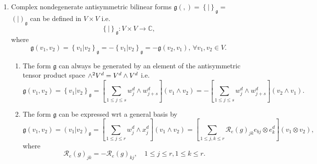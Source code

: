 \documentclass[aps,preprint]{revtex4}%
\begin{document}
\begin{enumerate}
\begin{enumerate}
\item
\begin{equation}
\left[  s\right]  \in\mathcal{B}_{00}\left(  V\right)  \cong V\otimes
V^{d}\cong V^{d}\otimes V^{d}.
\end{equation}

\end{enumerate}

\item Complex nondegenerate antisymmetric bilinear forms $\mathfrak{g}\left(
,\right)  =\left\{  \left.  {}\right\vert \left.  {}\right.  \right\}
_{\mathfrak{g}}=$ $\left(  \left.  {}\right\vert \left.  {}\right.  \right)
_{\mathfrak{g}}$ can be defined in $V\times V$ i.e.
\begin{equation}
\left\{  \left.  {}\right\vert \left.  {}\right.  \right\}  _{\mathfrak{g}%
}:V\times V\rightarrow\mathbb{C},
\end{equation}
where
\begin{equation}
\mathfrak{g}\left(  v_{1},v_{2}\right)  =\left\{  \left.  v_{1}\right\vert
v_{2}\right\}  _{\mathfrak{g}}=-\left\{  \left.  v_{1}\right\vert
v_{2}\right\}  _{\mathfrak{g}}=-\mathfrak{g}\left(  v_{2},v_{1}\right)
,\,\forall v_{1},v_{2}\in V.
\end{equation}


\begin{enumerate}
\item The form $\mathfrak{g}$ can always be generated by an element of the
antisymmetric tensor product space ${\Large \wedge}^{2}V^{d}=V^{d}\wedge
V^{d}$ i.e.
\begin{equation}
\mathfrak{g}\left(  v_{1},v_{2}\right)  =\left\{  \left.  v_{1}\right\vert
v_{2}\right\}  _{\mathfrak{g}}=\left[  \sum_{1\leq j\leq s}w_{j}^{d}\wedge
w_{j+s}^{d}\right]  \left(  v_{1}\wedge v_{2}\right)  =-\left[  \sum_{1\leq
j\leq s}w_{j}^{d}\wedge w_{j+s}^{d}\right]  \left(  v_{2}\wedge v_{1}\right)
.
\end{equation}


\item The form $\mathfrak{g}$ can be expressed wrt a general basis by
\begin{equation}
\mathfrak{g}\left(  v_{1},v_{2}\right)  =\left(  \left.  v_{1}\right\vert
v_{2}\right)  _{\mathfrak{g}}=\left[  \sum_{1\leq j\leq r}w_{j}^{d}\wedge
x_{j}^{d}\right]  \left(  v_{1}\wedge v_{2}\right)  =\left[  \sum_{1\leq
j,k\leq r}\mathcal{R}_{e}\left(  g\right)  _{jk}e_{bj}\otimes e_{k}%
^{d}\right]  \left(  v_{1}\otimes v_{2}\right)  ,
\end{equation}
where
\begin{equation}
\mathcal{R}_{e}\left(  g\right)  _{jk}=-\mathcal{R}_{e}\left(  g\right)
_{kj},\quad1\leq j\leq r,1\leq k\leq r.
\end{equation}



\end{enumerate}
\end{enumerate}
\end{document}
